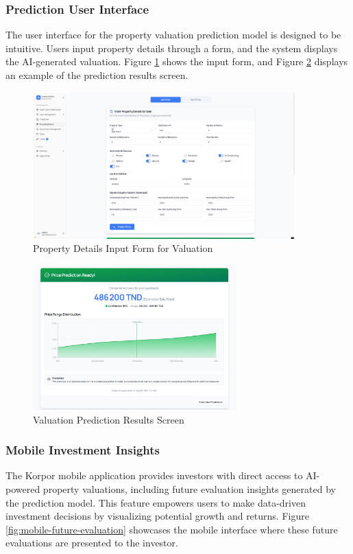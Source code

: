 \subsubsection{Prediction User Interface}
The user interface for the property valuation prediction model is designed to be intuitive. Users input property details through a form, and the system displays the AI-generated valuation. Figure \ref{fig:prediction-form} shows the input form, and Figure \ref{fig:prediction-results} displays an example of the prediction results screen.

\begin{figure}[htbp]
        \centering
        \includegraphics[width=0.9\textwidth]{images/screenshot_form_predition.png}
        \caption{Property Details Input Form for Valuation}
        \label{fig:prediction-form}
\end{figure}
\newpage
\begin{figure}[htbp]
        \centering
        \includegraphics[width=0.7\textwidth]{images/screenshot_predctionscreen.png}
        \caption{Valuation Prediction Results Screen}
        \label{fig:prediction-results}
\end{figure}

\subsubsection{Mobile Investment Insights}
The Korpor mobile application provides investors with direct access to AI-powered property valuations, including future evaluation insights generated by the prediction model. This feature empowers users to make data-driven investment decisions by visualizing potential growth and returns. Figure \ref{fig:mobile-future-evaluation} showcases the mobile interface where these future evaluations are presented to the investor.

